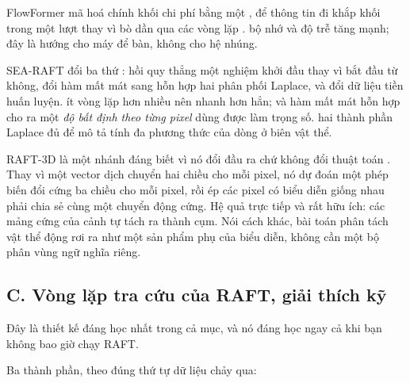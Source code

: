 \documentclass[../../deep_learning.tex]{subfiles}
\begin{document}
\begin{mach}
\item {}
\gp FlowFormer mã hoá chính khối chi phí bằng một , để thông tin đi khắp khối trong một lượt thay vì bò dần qua các vòng lặp \cite{huang2022flowformer}.
\gia bộ nhớ và độ trễ tăng mạnh; đây là hướng cho máy để bàn, không cho hệ nhúng.

\item {}
\gp SEA-RAFT đổi ba thứ \cite{wang2024searaft}: hồi quy thẳng một nghiệm khởi đầu thay vì bắt đầu từ không, đổi hàm mất mát sang hỗn hợp hai phân phối Laplace, và đổi dữ liệu tiền huấn luyện.
\hq ít vòng lặp hơn nhiều nên nhanh hơn hẳn; và hàm mất mát hỗn hợp cho ra một \emph{độ bất định theo từng pixel} dùng được làm trọng số.
\gd hai thành phần Laplace đủ để mô tả tính đa phương thức của dòng ở biên vật thể.
\end{mach}

RAFT-3D là một nhánh đáng biết vì nó đổi đầu ra chứ không đổi thuật toán \cite{teed2021raft3d}. Thay vì một vector dịch chuyển hai chiều cho mỗi pixel, nó dự đoán một phép biến đổi cứng ba chiều cho mỗi pixel, rồi ép các pixel có biểu diễn giống nhau phải chia sẻ cùng một chuyển động cứng. Hệ quả trực tiếp và rất hữu ích: các mảng cứng của cảnh tự tách ra thành cụm. Nói cách khác, bài toán phân tách vật thể động rơi ra như một sản phẩm phụ của biểu diễn, không cần một bộ phân vùng ngữ nghĩa riêng.

\subsection{C. Vòng lặp tra cứu của RAFT, giải thích kỹ}
Đây là thiết kế đáng học nhất trong cả mục, và nó đáng học ngay cả khi bạn không bao giờ chạy RAFT.

Ba thành phần, theo đúng thứ tự dữ liệu chảy qua:
\end{document}
